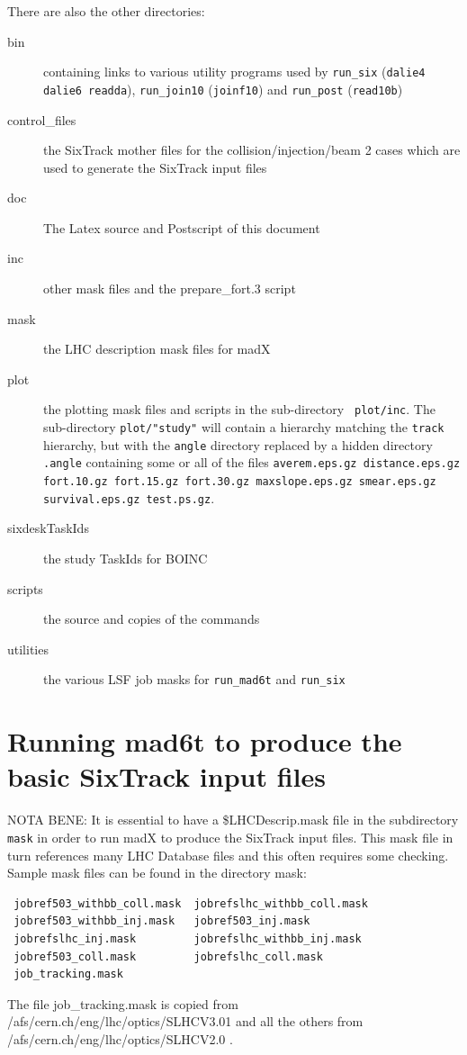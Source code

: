 \documentclass{cernatsnote}
\begin{document}
There are also the other directories:
\begin{description}
\item [bin] containing links to various utility programs used by {\tt run\_six}
({\tt dalie4 dalie6 readda}), {\tt run\_join10} ({\tt joinf10})
and {\tt run\_post} ({\tt read10b}) \item [control\_files] the SixTrack mother
  files for the collision/injection/beam 2 cases which are used to generate the
  SixTrack input files
\item [doc] The Latex source and Postscript of this document
\item [inc] other mask files and the prepare\_fort.3 script
\item [mask] the LHC description mask files for madX
\item [plot] the plotting mask files and scripts in the sub-directory {\tt
  plot/inc}.  The sub-directory {\tt plot/"study"} will contain a hierarchy
  matching the {\tt track} hierarchy, but with the {\tt angle} directory
  replaced by a hidden directory {\tt .angle}  containing some or all of the
  files {\tt averem.eps.gz distance.eps.gz fort.10.gz fort.15.gz fort.30.gz
    maxslope.eps.gz smear.eps.gz survival.eps.gz test.ps.gz}.
\item [sixdeskTaskIds] the study TaskIds for BOINC
\item [scripts] the source and copies of the commands
\item [utilities] the various LSF job masks for {\tt run\_mad6t} and {\tt run\_six}
\end{description}
\section{Running mad6t to produce the basic SixTrack input files}
\label{sec:mad_6t}
NOTA BENE: It is essential to have a \$LHCDescrip.mask file in the subdirectory
{\tt mask} in order to run madX to produce the SixTrack input files. This mask
file in turn references many LHC Database files and this often requires some
checking.  Sample mask files can be found in the directory mask:
\begin{verbatim}
 jobref503_withbb_coll.mask  jobrefslhc_withbb_coll.mask  
 jobref503_withbb_inj.mask   jobref503_inj.mask        
 jobrefslhc_inj.mask         jobrefslhc_withbb_inj.mask
 jobref503_coll.mask         jobrefslhc_coll.mask        
 job_tracking.mask
\end{verbatim}
The file job\_tracking.mask is copied from
/afs/cern.ch/eng/lhc/optics/SLHCV3.01 and all the others from
/afs/cern.ch/eng/lhc/optics/SLHCV2.0 \cite{31b}.
\end{document}
